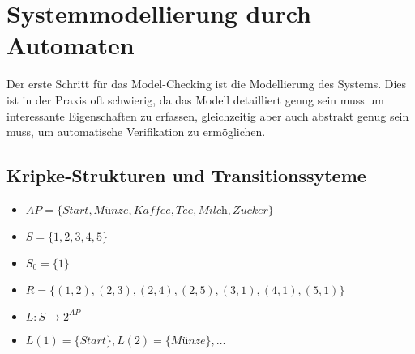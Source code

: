 \section{Systemmodellierung durch Automaten}
\label{sec:para2}

Der erste Schritt für das Model-Checking ist die Modellierung des Systems. Dies ist in der Praxis oft schwierig, da das Modell detailliert genug sein muss um interessante Eigenschaften zu erfassen, gleichzeitig aber auch abstrakt genug sein muss, um automatische Verifikation zu ermöglichen.

\subsection{Kripke-Strukturen und Transitionssyteme}
\begin{bsp}
	\mbox{}
	\begin{center}
	\end{center}

	\begin{itemize}
		\item $AP = \{\textit{Start}, \textit{Münze}, \textit{Kaffee}, \textit{Tee}, \textit{Milch}, \textit{Zucker}\}$
		\item $S = \{1,2,3,4,5\}$
		\item $S_0 = \{1\}$
		\item $R = \{(1,2),(2,3),(2,4),(2,5),(3,1),(4,1),(5,1)\}$
		\item $L:S\rightarrow2^{AP}$
		\item $L(1) = \{\textit{Start}\}, L(2)=\{\textit{Münze}\}, \dots$
	\end{itemize}
\end{bsp}


